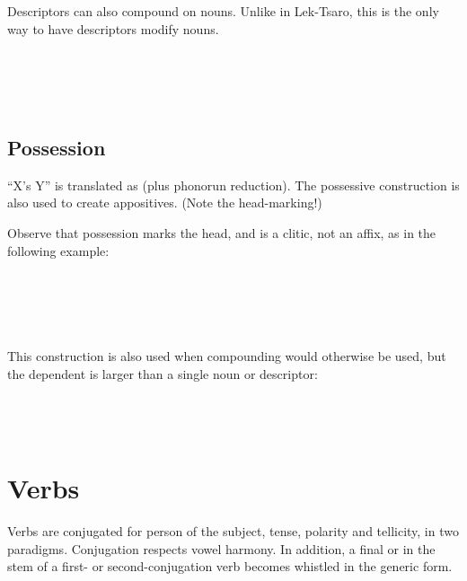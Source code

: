 \documentclass{book}
\begin{document}
Descriptors can also compound on nouns. Unlike in Lek-Tsaro, this is the only way to have descriptors modify nouns. \\
~\\
 \\
 \\
 \\
 

\section{Possession}

``X's Y'' is translated as  (plus phonorun reduction). The possessive construction is also used to create appositives. (Note the head-marking!)

Observe that possession marks the head, and  is a clitic, not an affix, as in the following example: \\
~\\
 \\
 \\
  \\
  \\

This construction is also used when compounding would otherwise be used, but the dependent is larger than a single noun or descriptor: \\
~\\
 \\
    \\
 

\chapter{Verbs}

Verbs are conjugated for person of the subject, tense, polarity and tellicity, in two paradigms. Conjugation respects vowel harmony. In addition, a final  or  in the stem of a first- or second-conjugation verb becomes whistled in the generic form.
\end{document}
